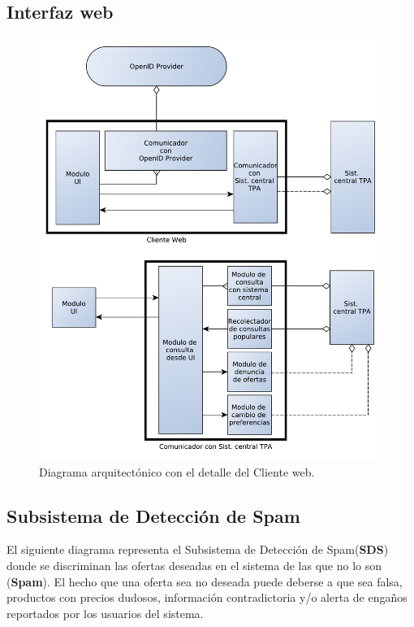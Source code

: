 \subsection{Interfaz web}

\begin{figure}[H]
	\centering
	\includegraphics[width=\textwidth]{graficos/arch/Cliente_web.pdf}
	\caption{Diagrama arquitectónico con el detalle del \textsf{Cliente web}.}
\end{figure}


\subsection{Subsistema de Detección de Spam}

El siguiente diagrama representa el Subsistema de Detección de Spam(\textbf{SDS}) donde se discriminan las ofertas deseadas en el sistema de las que no lo son (\textbf{Spam}). El hecho que una oferta sea no deseada puede deberse a que sea falsa, productos con precios dudosos, información contradictoria y/o alerta de enga\~{n}os reportados por los usuarios del sistema.

